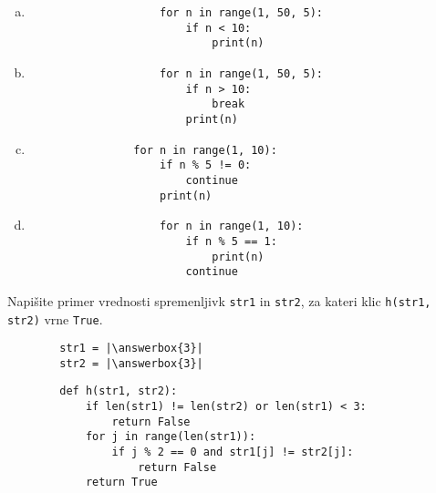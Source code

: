 \documentclass[arhiv, 10pt]{../izpit}
\newcommand{\inlinepy}[1]{\texttt{#1}}
\newcommand{\answerbox}[1]{\framebox{\vphantom{\large M}\hspace{#1cm}}}
\begin{document}
        \begin{multicols}{2}
        \begin{enumerate}[(a)]
\item 
                \begin{verbatim}
                    for n in range(1, 50, 5):
                        if n < 10:
                            print(n)
                \end{verbatim}
            
\item 
                \begin{verbatim}
                    for n in range(1, 50, 5):
                        if n > 10:
                            break
                        print(n)
                \end{verbatim}
            
\item 
            \begin{verbatim}
                for n in range(1, 10):
                    if n % 5 != 0:
                        continue
                    print(n)
            \end{verbatim}
        
\item 
                \begin{verbatim}
                    for n in range(1, 10):
                        if n % 5 == 1:
                            print(n)
                        continue
                \end{verbatim}
            
\end{enumerate}

        \end{multicols}
    
        \naloga*
        \begin{multicols}{2}
        \noindent
        Napišite primer vrednosti spremenljivk \inlinepy{str1} in \inlinepy{str2}, za kateri klic \inlinepy{h(str1, str2)} vrne \inlinepy{True}.
        \begin{verbatim}
        str1 = |\answerbox{3}|
        str2 = |\answerbox{3}|
        \end{verbatim}
        \vfil
        \columnbreak
        \begin{verbatim}
        def h(str1, str2):
            if len(str1) != len(str2) or len(str1) < 3:
                return False
            for j in range(len(str1)):
                if j % 2 == 0 and str1[j] != str2[j]:
                    return False
            return True
        \end{verbatim}
        \end{multicols}
    
\end{document}

